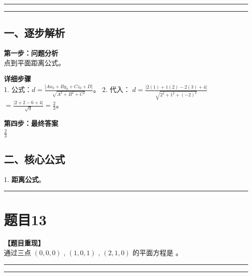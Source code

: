 \documentclass[12pt, a4paper]{ctexart}
\newcommand{\TopSeparator}{
    \par\noindent\rule{\textwidth}{1.5pt}\vspace{0.5em} %
}
\newcommand{\AnalysisSeparator}{
    \par\noindent\rule{\textwidth}{0.5pt}\vspace{0.2em}\hrule\vspace{0.5em} %
}
\newenvironment{RedAnalysis}{
    \par
    \color{red} %
}{
    \par
    \color{black} %
}
\begin{document}
\AnalysisSeparator

\begin{RedAnalysis}

\subsection*{一、逐步解析}

\textbf{第一步：问题分析} \\
点到平面距离公式。

\textbf{详细步骤} \\
1. 公式：$d = \frac{|Ax_0 + By_0 + Cz_0 + D|}{\sqrt{A^2+B^2+C^2}}$。
2. 代入：
   $d = \frac{|2(1) + 1(2) - 2(3) + 4|}{\sqrt{2^2 + 1^2 + (-2)^2}}$
   $= \frac{|2+2-6+4|}{\sqrt{9}} = \frac{2}{3}$。

\textbf{第四步：最终答案} \\
$ \frac{2}{3} $

\subsection*{二、核心公式}
1. \textbf{距离公式}。

\end{RedAnalysis}

\vspace{2em}

\TopSeparator
\section*{题目13}

\textbf{【题目重现】} \\
通过三点 $ (0,0,0) $ , $ (1,0,1) $ , $ (2,1,0) $ 的平面方程是 \underline{\hspace{2cm}}。

\AnalysisSeparator
\end{document}
